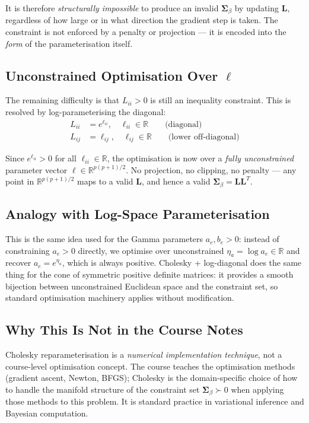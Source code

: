 \documentclass[11pt]{article}
\newcommand{\R}{\mathbb{R}}
\begin{document}
It is therefore \emph{structurally impossible} to produce an invalid $\bm{\Sigma}_\beta$ by updating $\bm{L}$, regardless of how large or in what direction the gradient step is taken. The constraint is not enforced by a penalty or projection --- it is encoded into the \emph{form} of the parameterisation itself.

\subsection*{Unconstrained Optimisation Over $\bm{\ell}$}

The remaining difficulty is that $L_{ii} > 0$ is still an inequality constraint. This is resolved by log-parameterising the diagonal:
\begin{align}
  L_{ii} &= e^{\ell_{ii}}, \quad \ell_{ii} \in \R \qquad \text{(diagonal)}\\
  L_{ij} &= \ell_{ij}, \quad \ell_{ij} \in \R \qquad \text{(lower off-diagonal)}
\end{align}

Since $e^{\ell_{ii}} > 0$ for all $\ell_{ii} \in \R$, the optimisation is now over a \emph{fully unconstrained} parameter vector $\bm{\ell} \in \R^{p(p+1)/2}$. No projection, no clipping, no penalty --- any point in $\R^{p(p+1)/2}$ maps to a valid $\bm{L}$, and hence a valid $\bm{\Sigma}_\beta = \bm{L}\bm{L}^T$.

\subsection*{Analogy with Log-Space Parameterisation}

This is the same idea used for the Gamma parameters $a_e, b_e > 0$: instead of constraining $a_e > 0$ directly, we optimise over unconstrained $\eta_a = \log a_e \in \R$ and recover $a_e = e^{\eta_a}$, which is always positive. Cholesky + log-diagonal does the same thing for the cone of symmetric positive definite matrices: it provides a smooth bijection between unconstrained Euclidean space and the constraint set, so standard optimisation machinery applies without modification.

\subsection*{Why This Is Not in the Course Notes}

Cholesky reparameterisation is a \emph{numerical implementation technique}, not a course-level optimisation concept. The course teaches the optimisation methods (gradient ascent, Newton, BFGS); Cholesky is the domain-specific choice of how to handle the manifold structure of the constraint set $\bm{\Sigma}_\beta \succ 0$ when applying those methods to this problem. It is standard practice in variational inference and Bayesian computation.
\end{document}
